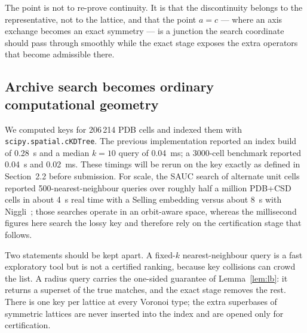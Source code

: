 \documentclass[11pt]{article}
\begin{document}
The point is not to re-prove continuity. It is that the discontinuity belongs to the representative, not to the lattice, and that the point $a=c$ --- where an axis exchange becomes an exact symmetry --- is a junction the search coordinate should pass through smoothly while the exact stage exposes the extra operators that become admissible there.


\subsection{Archive search becomes ordinary computational geometry}

We computed keys for 206\,214 PDB cells and indexed them with \texttt{scipy.spatial.cKDTree}. The previous implementation reported an index build of \SI{0.28}{\second} and a median $k=10$ query of \SI{0.04}{\milli\second}; a 3000-cell benchmark reported \SI{0.04}{\second} and \SI{0.02}{\milli\second}. These timings will be rerun on the key exactly as defined in Section~2.2 before submission. For scale, the SAUC search of alternate unit cells reported 500-nearest-neighbour queries over roughly half a million PDB+CSD cells in about \SI{4}{\second} real time with a Selling embedding versus about \SI{8}{\second} with Niggli~\cite{mcgill2014}; those searches operate in an orbit-aware space, whereas the millisecond figures here search the lossy key and therefore rely on the certification stage that follows.

Two statements should be kept apart. A fixed-$k$ nearest-neighbour query is a fast exploratory tool but is not a certified ranking, because key collisions can crowd the list. A radius query carries the one-sided guarantee of Lemma~\ref{lem:lb}: it returns a superset of the true matches, and the exact stage removes the rest. There is one key per lattice at every Voronoi type; the extra superbases of symmetric lattices are never inserted into the index and are opened only for certification.
\end{document}
